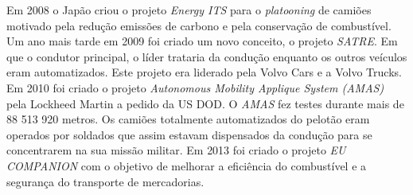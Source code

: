 Em 2008 o Japão criou o projeto \textit{Energy ITS} para o \textit{platooning} de camiões motivado pela redução emissões de carbono e pela conservação de combustível. 
Um ano mais tarde em 2009 foi criado um novo conceito, o projeto \textit{SATRE}. Em que o condutor principal, o líder trataria da condução enquanto os outros veículos eram automatizados. Este projeto era liderado pela Volvo Cars e a Volvo Trucks.
Em 2010 foi criado o projeto \textit{Autonomous Mobility Applique System (AMAS)} pela Lockheed Martin 
a pedido da US DOD. O \textit{AMAS} fez testes durante mais de 88 513 920 metros. Os camiões totalmente automatizados do pelotão eram operados por soldados que assim estavam dispensados da condução para se concentrarem na sua missão militar.
Em 2013 foi criado o projeto \textit{EU COMPANION} com o objetivo de melhorar a eficiência do combustível e a segurança do transporte de mercadorias. 